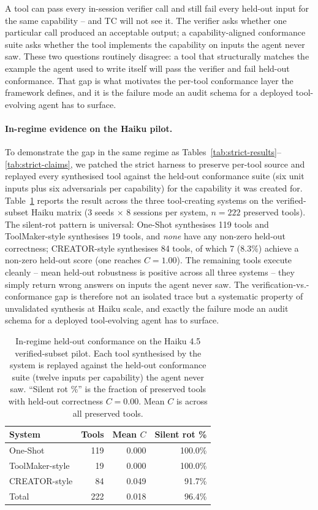\documentclass[sigconf,anonymous,review,natbib=false]{acmart}
\begin{document}
A tool can pass every in-session verifier call and still fail every held-out input for the same capability -- and TC will not see it. The verifier asks whether one particular call produced an acceptable output; a capability-aligned conformance suite asks whether the tool implements the capability on inputs the agent never saw. These two questions routinely disagree: a tool that structurally matches the example the agent used to write itself will pass the verifier and fail held-out conformance. That gap is what motivates the per-tool conformance layer the framework defines, and it is the failure mode an audit schema for a deployed tool-evolving agent has to surface.

\paragraph{In-regime evidence on the Haiku pilot.} To demonstrate the gap in the same regime as Tables~\ref{tab:strict-results}--\ref{tab:strict-claims}, we patched the strict harness to preserve per-tool source and replayed every synthesised tool against the held-out conformance suite (six unit inputs plus six adversarials per capability) for the capability it was created for. Table~\ref{tab:conformance} reports the result across the three tool-creating systems on the verified-subset Haiku matrix (3 seeds $\times$ 8 sessions per system, $n{=}222$ preserved tools). The silent-rot pattern is universal: One-Shot synthesises 119 tools and ToolMaker-style synthesises 19 tools, and \emph{none} have any non-zero held-out correctness; CREATOR-style synthesises 84 tools, of which 7 ($8.3\%$) achieve a non-zero held-out score (one reaches $C{=}1.00$). The remaining tools execute cleanly -- mean held-out robustness is positive across all three systems -- they simply return wrong answers on inputs the agent never saw. The verification-vs.-conformance gap is therefore not an isolated trace but a systematic property of unvalidated synthesis at Haiku scale, and exactly the failure mode an audit schema for a deployed tool-evolving agent has to surface.

\begin{table}[t]
\centering
\small
\caption{In-regime held-out conformance on the Haiku 4.5 verified-subset pilot. Each tool synthesised by the system is replayed against the held-out conformance suite (twelve inputs per capability) the agent never saw. ``Silent rot \%'' is the fraction of preserved tools with held-out correctness $C{=}0.00$. Mean $C$ is across all preserved tools.}
\label{tab:conformance}
\begin{tabular}{lrrr}
\toprule
\textbf{System} & \textbf{Tools} & \textbf{Mean $C$} & \textbf{Silent rot \%} \\
\midrule
One-Shot         & 119 & 0.000 & 100.0\% \\
ToolMaker-style  & 19  & 0.000 & 100.0\% \\
CREATOR-style    & 84  & 0.049 & 91.7\% \\
\midrule
Total            & 222 & 0.018 & 96.4\% \\
\bottomrule
\end{tabular}
\end{table}
\end{document}
